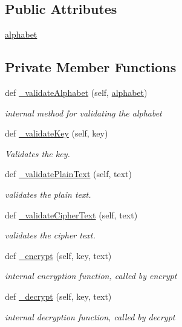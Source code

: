 \subsection*{Public Attributes}
\begin{DoxyCompactItemize}
\item 
\mbox{\hyperlink{classEncryptionAlgorithms_1_1EncryptionAlgorithm_ad43b0d5680d18b7bc62848864e496684}{alphabet}}
\end{DoxyCompactItemize}
\subsection*{Private Member Functions}
\begin{DoxyCompactItemize}
\item 
def \mbox{\hyperlink{classEncryptionAlgorithms_1_1EncryptionAlgorithm_af3d6de15270153827e6928c5e9fd65be}{\+\_\+validate\+Alphabet}} (self, \mbox{\hyperlink{classEncryptionAlgorithms_1_1EncryptionAlgorithm_ad43b0d5680d18b7bc62848864e496684}{alphabet}})
\begin{DoxyCompactList}\small\item\em internal method for validating the alphabet \end{DoxyCompactList}\item 
def \mbox{\hyperlink{classEncryptionAlgorithms_1_1EncryptionAlgorithm_af28e6d27846bd1690122b68edb95a486}{\+\_\+validate\+Key}} (self, key)
\begin{DoxyCompactList}\small\item\em Validates the key. \end{DoxyCompactList}\item 
def \mbox{\hyperlink{classEncryptionAlgorithms_1_1EncryptionAlgorithm_a78d73cf66cbaca8f534bbfd5609a984d}{\+\_\+validate\+Plain\+Text}} (self, text)
\begin{DoxyCompactList}\small\item\em validates the plain text. \end{DoxyCompactList}\item 
def \mbox{\hyperlink{classEncryptionAlgorithms_1_1EncryptionAlgorithm_a1b5077d40cae2bb5d71e9a7df94757c4}{\+\_\+validate\+Cipher\+Text}} (self, text)
\begin{DoxyCompactList}\small\item\em validates the cipher text. \end{DoxyCompactList}\item 
def \mbox{\hyperlink{classEncryptionAlgorithms_1_1EncryptionAlgorithm_ab69e2900b19527168901b083b4eb4ec4}{\+\_\+encrypt}} (self, key, text)
\begin{DoxyCompactList}\small\item\em internal encryption function, called by encrypt \end{DoxyCompactList}\item 
def \mbox{\hyperlink{classEncryptionAlgorithms_1_1EncryptionAlgorithm_af2c4a5b86561ddb3d9465477b83904b5}{\+\_\+decrypt}} (self, key, text)
\begin{DoxyCompactList}\small\item\em internal decryption function, called by decrypt \end{DoxyCompactList}\end{DoxyCompactItemize}


